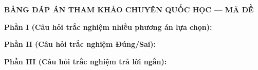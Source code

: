 
\newpage
\begin{center} \textbf{BẢNG ĐÁP ÁN THAM KHẢO CHUYÊN QUỐC HỌC --- MÃ ĐỀ \thedeso} \end{center}

\noindent \textbf{Phần I (Câu hỏi trắc nghiệm nhiều phương án lựa chọn):}  

\noindent \textbf{Phần II (Câu hỏi trắc nghiệm Đúng/Sai):}

\noindent \textbf{Phần III (Câu hỏi trắc nghiệm trả lời ngắn):}

\label{B\thedeso}

